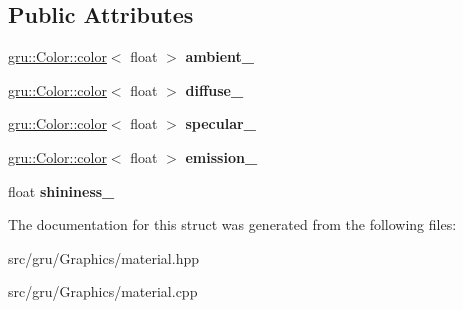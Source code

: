 \subsection*{\-Public \-Attributes}
\begin{DoxyCompactItemize}
\item 
\hypertarget{structglutpp_1_1material_1_1raw_a7bc634326c49ac8836b5726024a8ef95}{\hyperlink{classgru_1_1Color_1_1color}{gru\-::\-Color\-::color}$<$ float $>$ {\bfseries ambient\-\_\-}}\label{structglutpp_1_1material_1_1raw_a7bc634326c49ac8836b5726024a8ef95}

\item 
\hypertarget{structglutpp_1_1material_1_1raw_aa139c8d1f8d569e677467bb03f273120}{\hyperlink{classgru_1_1Color_1_1color}{gru\-::\-Color\-::color}$<$ float $>$ {\bfseries diffuse\-\_\-}}\label{structglutpp_1_1material_1_1raw_aa139c8d1f8d569e677467bb03f273120}

\item 
\hypertarget{structglutpp_1_1material_1_1raw_aafcf25c7a5e30393d4a37290207bb041}{\hyperlink{classgru_1_1Color_1_1color}{gru\-::\-Color\-::color}$<$ float $>$ {\bfseries specular\-\_\-}}\label{structglutpp_1_1material_1_1raw_aafcf25c7a5e30393d4a37290207bb041}

\item 
\hypertarget{structglutpp_1_1material_1_1raw_abd14da23e424d13ed13a21326be98f5a}{\hyperlink{classgru_1_1Color_1_1color}{gru\-::\-Color\-::color}$<$ float $>$ {\bfseries emission\-\_\-}}\label{structglutpp_1_1material_1_1raw_abd14da23e424d13ed13a21326be98f5a}

\item 
\hypertarget{structglutpp_1_1material_1_1raw_a002a3524745e18b298dbb995cc83c19e}{float {\bfseries shininess\-\_\-}}\label{structglutpp_1_1material_1_1raw_a002a3524745e18b298dbb995cc83c19e}

\end{DoxyCompactItemize}


\-The documentation for this struct was generated from the following files\-:\begin{DoxyCompactItemize}
\item 
src/gru/\-Graphics/material.\-hpp\item 
src/gru/\-Graphics/material.\-cpp\end{DoxyCompactItemize}
